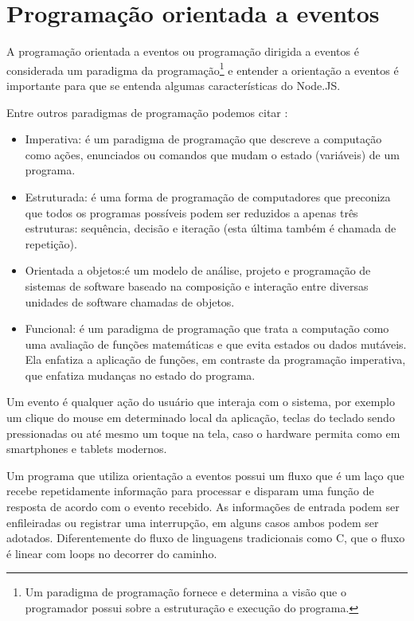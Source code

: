 \section{Programação orientada a eventos}
\label{sec:Programação orientada a eventos}
\nocite{eventDrivenPro}
A programação orientada a eventos ou programação dirigida a eventos é considerada um paradigma da programação\footnote{Um paradigma de programação fornece e determina a visão que o programador possui sobre a estruturação e execução do programa.} e entender a orientação a eventos é importante para que se entenda algumas características do Node.JS. 

Entre outros paradigmas de programação podemos citar \cite{prdgProg}:
\begin{itemize}
  \item Imperativa: é um paradigma de programação que descreve a computação como ações, enunciados ou comandos que mudam o estado (variáveis) de um programa.
  \item Estruturada: é uma forma de programação de computadores que preconiza que todos os programas possíveis podem ser reduzidos a apenas três estruturas: sequência, decisão e iteração (esta última também é chamada de repetição).
  \item Orientada a objetos:é um modelo de análise, projeto e programação de sistemas de software baseado na composição e interação entre diversas unidades de software chamadas de objetos.
  \item Funcional: é um paradigma de programação que trata a computação como uma avaliação de funções matemáticas e que evita estados ou dados mutáveis. Ela enfatiza a aplicação de funções, em contraste da programação imperativa, que enfatiza mudanças no estado do programa.
\end{itemize}

Um evento é qualquer ação do usuário que interaja com o sistema, por exemplo um clique do mouse em determinado local da aplicação, teclas do teclado sendo pressionadas ou até mesmo um toque na tela, caso o hardware permita como em smartphones e tablets modernos.

Um programa que utiliza orientação a eventos possui um fluxo que é um laço que recebe repetidamente informação para processar e disparam uma função de resposta de acordo com o evento recebido. As informações de entrada podem ser enfileiradas ou registrar uma interrupção, em alguns casos ambos podem ser adotados. Diferentemente do fluxo de linguagens tradicionais como C, que o fluxo é linear com loops no decorrer do caminho.

